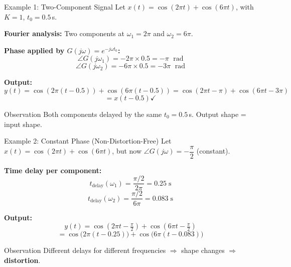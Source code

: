 \documentclass{beamer}
\begin{document}
\begin{frame}{Example 1: Two-Component Signal}
Let $x(t) = \cos(2\pi t) + \cos(6\pi t)$, with $K = 1$, $t_0 = 0.5\,$s.

\vspace{0.5em}
\textbf{Fourier analysis:} Two components at $\omega_1 = 2\pi$ and $\omega_2 = 6\pi$.

\vspace{0.3em}
\textbf{Phase applied by $G(j\omega) = e^{-j\omega t_0}$:}
\[
  \angle G(j\omega_1) = -2\pi \times 0.5 = -\pi \;\text{ rad}
\]
\[
  \angle G(j\omega_2) = -6\pi \times 0.5 = -3\pi \;\text{ rad}
\]

\textbf{Output:}
\[
  y(t) = \cos(2\pi(t-0.5)) + \cos(6\pi(t-0.5))
       = \cos(2\pi t - \pi) + \cos(6\pi t - 3\pi)
\]
\[
  = x(t - 0.5) \checkmark
\]
\begin{block}{Observation}
Both components delayed by the same $t_0 = 0.5\,$s. Output shape = input shape.
\end{block}
\end{frame}

\begin{frame}{Example 2: Constant Phase (Non-Distortion-Free)}
Let $x(t) = \cos(2\pi t) + \cos(6\pi t)$, but now $\angle G(j\omega) = -\dfrac{\pi}{2}$ (constant).

\vspace{0.5em}
\textbf{Time delay per component:}
\[
  t_{\text{delay}}(\omega_1) = \frac{\pi/2}{2\pi} = 0.25\;\text{s}
\]
\[
  t_{\text{delay}}(\omega_2) = \frac{\pi/2}{6\pi} = 0.083\;\text{s}
\]

\textbf{Output:}
\[
  y(t) = \cos(2\pi t - \tfrac{\pi}{2}) + \cos(6\pi t - \tfrac{\pi}{2})
\]
\[
  = \cos\!\bigl(2\pi(t-0.25)\bigr) + \cos\!\bigl(6\pi(t-0.083)\bigr)
\]

\begin{block}{Observation}
Different delays for different frequencies $\Rightarrow$ shape changes $\Rightarrow$ \textbf{distortion}.
\end{block}
\end{frame}
\end{document}

